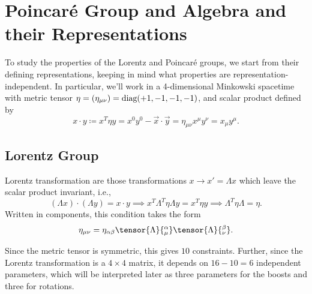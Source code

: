 \section{Poincaré Group and Algebra and their Representations}
To study the properties of the Lorentz and Poincaré groups, we start from their defining representations, keeping in mind what properties are representation-independent. In particular, we'll work in a 4-dimensional Minkowski spacetime with metric tensor $\eta = (\eta_{\mu\nu}) = \textup{diag}(+1,-1,-1,-1)$, and scalar product defined by
\begin{equation}
    x \cdot y \coloneq x^T \eta y = x^0y^0-\vec{x}\cdot\vec{y} = \eta_{\mu\nu} x^\mu y^\nu = x_\mu y^\mu .
\end{equation}


\subsection{Lorentz Group}\label{sec:lorentz-group}
Lorentz transformation are those transformations $x \to x' = \Lambda x$ which leave the scalar product invariant, i.e.,
\begin{equation}
    (\Lambda x) \cdot (\Lambda y) = x \cdot y \implies x^T \Lambda^T \eta \Lambda y = x^T \eta y \implies \Lambda^T \eta \Lambda = \eta .
\end{equation}
Written in components, this condition takes the form
\begin{equation}\label{eq:lorentz-transf-def-components}
    \eta_{\mu\nu} = \eta_{\alpha\beta} \tensor{\Lambda}{^\alpha_\mu} \tensor{\Lambda}{^\beta_\nu}.
\end{equation}

Since the metric tensor is symmetric, this gives $10$ constraints. Further, since the Lorentz transformation is a $4 \times 4$ matrix, it depends on $16-10 = 6$ independent parameters, which will be interpreted later as three parameters for the boosts and three for rotations. 

